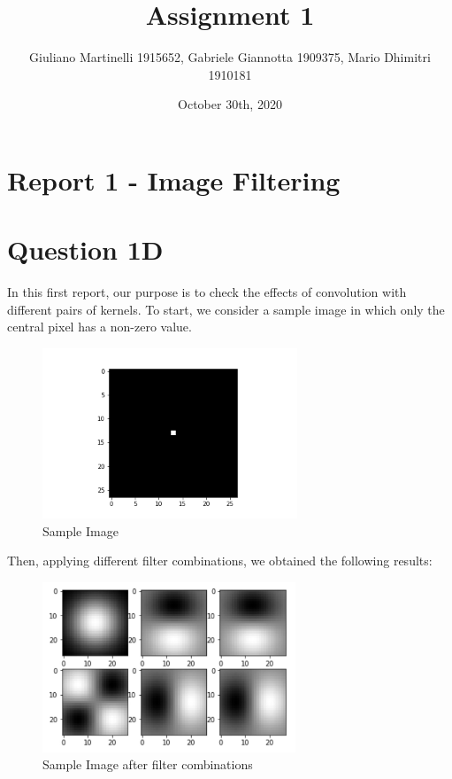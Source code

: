 \documentclass[
	12pt, %
]{fphw}
\title{Assignment 1} %
\author{Giuliano Martinelli 1915652, Gabriele Giannotta 1909375, Mario Dhimitri 1910181 } %
\date{October 30th, 2020} %
\institute{Sapienza Università di Roma \\ Data Science} %
\begin{document}
\maketitle %


\section*{Report 1 - Image Filtering}
\section { Question 1D}

In this first report, our purpose is to check the effects of convolution with different pairs of kernels. To start, we consider a sample image in which only the central pixel has a non-zero value.

\begin{figure}[h!]
    \centering
    \includegraphics[height=2in]{img/1d/sample1.png}
     \caption{Sample Image}
\end{figure}

Then, applying different filter combinations, we obtained the following results:

\begin{figure}[h!]
    \centering
    \includegraphics[height=2in]{img/1d/fig2.jpg}
     \caption{Sample Image after filter combinations}
\end{figure}
\end{document}
